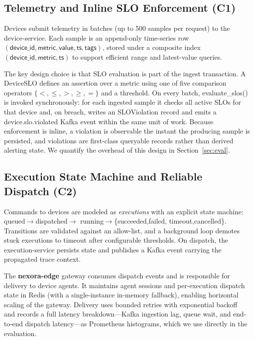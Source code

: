 \documentclass[review,12pt]{elsarticle}
\begin{document}
\subsection{Telemetry and Inline SLO Enforcement (C1)}
\label{sec:slo}
Devices submit telemetry in batches (up to 500 samples per request) to the
device-service. Each sample is an append-only time-series row
$(\textsf{device\_id}, \textsf{metric}, \textsf{value}, \textsf{ts},
\textsf{tags})$, stored under a composite index
$(\textsf{device\_id}, \textsf{metric}, \textsf{ts})$ to support efficient
range and latest-value queries.

The key design choice is that SLO evaluation is part of the ingest transaction.
A \textsf{DeviceSLO} defines an assertion over a metric using one of five
comparison operators $\{<,\le,>,\ge,=\}$ and a threshold. On every batch,
\textsf{evaluate\_slos()} is invoked synchronously: for each ingested sample it
checks all active SLOs for that device and, on breach, writes an
\textsf{SLOViolation} record and emits a \textsf{device.slo.violated} Kafka
event within the same unit of work. Because enforcement is inline, a violation
is observable the instant the producing sample is persisted, and violations are
first-class queryable records rather than derived alerting state. We quantify
the overhead of this design in Section~\ref{sec:eval}.

\subsection{Execution State Machine and Reliable Dispatch (C2)}
\label{sec:dispatch}
Commands to devices are modeled as \emph{executions} with an explicit state
machine: \textsf{queued}$\rightarrow$\textsf{dispatched}$\rightarrow$%
\textsf{running}$\rightarrow$\{\textsf{succeeded},\textsf{failed},%
\textsf{timeout},\textsf{cancelled}\}. Transitions are validated against an
allow-list, and a background loop demotes stuck executions to \textsf{timeout}
after configurable thresholds. On dispatch, the execution-service persists state
and publishes a Kafka event carrying the propagated trace context.

The \textbf{nexora-edge} gateway consumes dispatch events and is responsible for
delivery to device agents. It maintains agent sessions and per-execution
dispatch state in Redis (with a single-instance in-memory fallback), enabling
horizontal scaling of the gateway. Delivery uses bounded retries with
exponential backoff and records a full latency breakdown---Kafka ingestion lag,
queue wait, and end-to-end dispatch latency---as Prometheus histograms, which we
use directly in the evaluation.
\end{document}
